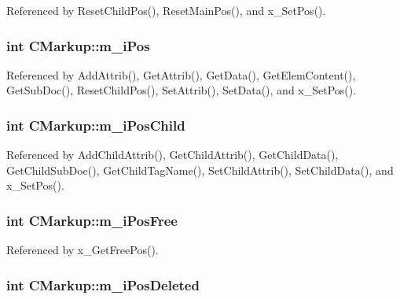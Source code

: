 Referenced by ResetChildPos(), ResetMainPos(), and x\_\-SetPos().
\subsubsection[m\_\-iPos]{\setlength{\rightskip}{0pt plus 5cm}int {\bf CMarkup::m\_\-iPos}\hspace{0.3cm}{\tt  [protected]}}\label{classCMarkup_1192dbba85b74f3346dfd042ed7f0b59}




Referenced by AddAttrib(), GetAttrib(), GetData(), GetElemContent(), GetSubDoc(), ResetChildPos(), SetAttrib(), SetData(), and x\_\-SetPos().
\subsubsection[m\_\-iPosChild]{\setlength{\rightskip}{0pt plus 5cm}int {\bf CMarkup::m\_\-iPosChild}\hspace{0.3cm}{\tt  [protected]}}\label{classCMarkup_b9070540ecb1b4da5c30a680718cf73a}




Referenced by AddChildAttrib(), GetChildAttrib(), GetChildData(), GetChildSubDoc(), GetChildTagName(), SetChildAttrib(), SetChildData(), and x\_\-SetPos().
\subsubsection[m\_\-iPosFree]{\setlength{\rightskip}{0pt plus 5cm}int {\bf CMarkup::m\_\-iPosFree}\hspace{0.3cm}{\tt  [protected]}}\label{classCMarkup_d81bcd568dabbf0798a61bb8439b2f35}




Referenced by x\_\-GetFreePos().
\subsubsection[m\_\-iPosDeleted]{\setlength{\rightskip}{0pt plus 5cm}int {\bf CMarkup::m\_\-iPosDeleted}\hspace{0.3cm}{\tt  [protected]}}\label{classCMarkup_8a1c502479f990916d887093b4048de5}


